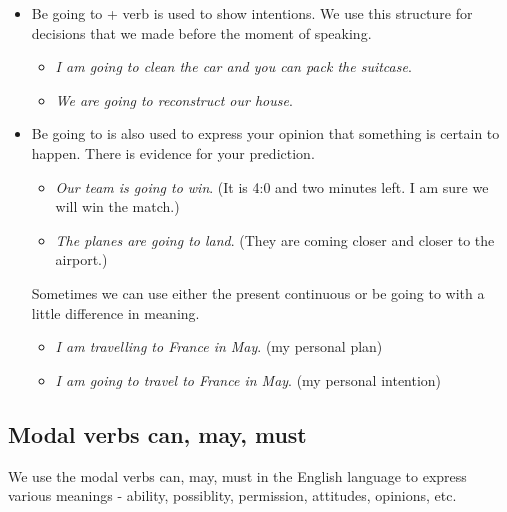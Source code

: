 \begin{itemize}

\item Be going to + verb is used to show intentions. We use this structure for decisions that we made before the moment of speaking.

\begin{itemize}

\item \textit{I am going to clean the car and you can pack the suitcase}.
\item \textit{We are going to reconstruct our house}.
\end{itemize}

\item Be going to is also used to express your opinion that something is certain to happen. There is evidence for your prediction.

\begin{itemize}

\item \textit{Our team is going to win}. (It is 4:0 and two minutes left. I am sure we will win the match.) 
\item \textit{The planes are going to land}. (They are coming closer and closer to the airport.)
\end{itemize}

Sometimes we can use either the present continuous or be going to with a little difference in meaning.

\begin{itemize}

\item \textit{I am travelling to France in May}. (my personal plan)
\item \textit{I am going to travel to France in May}. (my personal intention)
\end{itemize}

\end{itemize}


\subsection{Modal verbs can, may, must}

We use the modal verbs can, may, must in the English language to express various meanings - ability, possiblity, permission, attitudes, opinions, etc.

